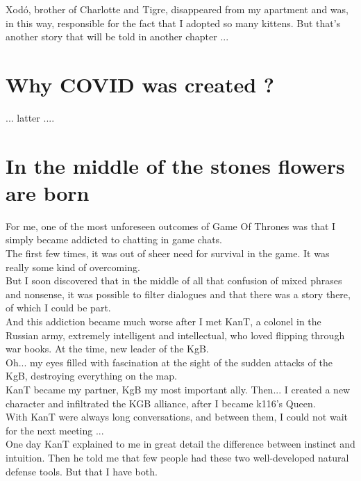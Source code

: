 \documentclass[11pt]{book}
\begin{document}
\noindent Xodó, brother of Charlotte and Tigre, disappeared from my apartment and was, in this way, responsible for the fact that I adopted so many kittens. But that's another story that will be told in another chapter ... \\

\chapter{Why COVID was created ?}

... latter ....

\chapter{In the middle of the stones flowers are born}

\noindent For me, one of the most unforeseen outcomes of Game Of Thrones was that I simply became addicted to chatting in game chats. \\

 \noindent The first few times, it was out of sheer need for survival in the game. It was really some kind of overcoming. \\

\noindent But I soon discovered that in the middle of all that confusion of mixed phrases and nonsense, it was possible to filter dialogues and that there was a story there, of which I could be part. \\

\noindent And this addiction became much worse after I met KanT, a colonel in the Russian army, extremely intelligent and intellectual, who loved flipping through war books. At the time, new leader of the KgB.  \\

\noindent Oh... my eyes filled with fascination at the sight of the sudden attacks of the KgB, destroying everything on the map. \\

\noindent KanT became my partner, KgB my most important ally. Then... I created a new character and infiltrated the KGB alliance, after I became k116's Queen. \\ 

\noindent With KanT were always long conversations, and between them, I could not wait for the next meeting ... \\

\noindent One day KanT explained to me in great detail the difference between instinct and intuition. Then he told me that few people had these two well-developed natural defense tools. But that I have both. \\
\end{document}
